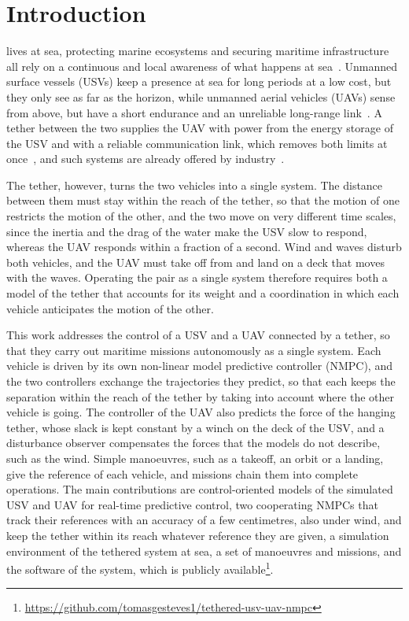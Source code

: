 \section{Introduction}
\label{sec:intro}

 lives at sea, protecting marine ecosystems and securing maritime infrastructure all rely on a continuous and local awareness of what happens at sea~\cite{europeanmaritimesafetyagencyEMSAOutlook2025_v302025}. Unmanned surface vessels (USVs) keep a presence at sea for long periods at a low cost, but they only see as far as the horizon, while unmanned aerial vehicles (UAVs) sense from above, but have a short endurance and an unreliable long-range link~\cite{zeng2016uav,kishk2020tethered}. A tether between the two supplies the UAV with power from the energy storage of the USV and with a reliable communication link, which removes both limits at once~\cite{kishk2020tethered}, and such systems are already offered by industry~\cite{exail_elistair_tethered,acua_ocean_teledyne_mod}.

The tether, however, turns the two vehicles into a single system. The distance between them must stay within the reach of the tether, so that the motion of one restricts the motion of the other, and the two move on very different time scales, since the inertia and the drag of the water make the USV slow to respond, whereas the UAV responds within a fraction of a second. Wind and waves disturb both vehicles, and the UAV must take off from and land on a deck that moves with the waves. Operating the pair as a single system therefore requires both a model of the tether that accounts for its weight and a coordination in which each vehicle anticipates the motion of the other.

This work addresses the control of a USV and a UAV connected by a tether, so that they carry out maritime missions autonomously as a single system. Each vehicle is driven by its own non-linear model predictive controller (NMPC), and the two controllers exchange the trajectories they predict, so that each keeps the separation within the reach of the tether by taking into account where the other vehicle is going. The controller of the UAV also predicts the force of the hanging tether, whose slack is kept constant by a winch on the deck of the USV, and a disturbance observer compensates the forces that the models do not describe, such as the wind. Simple manoeuvres, such as a takeoff, an orbit or a landing, give the reference of each vehicle, and missions chain them into complete operations. The main contributions are control-oriented models of the simulated USV and UAV for real-time predictive control, two cooperating NMPCs that track their references with an accuracy of a few centimetres, also under wind, and keep the tether within its reach whatever reference they are given, a simulation environment of the tethered system at sea, a set of manoeuvres and missions, and the software of the system, which is publicly available\footnote{\url{https://github.com/tomasgesteves1/tethered-usv-uav-nmpc}}.
